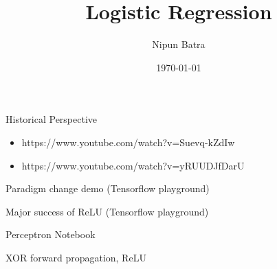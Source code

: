 \documentclass{beamer}
\title{Logistic Regression}
\date{\today}
\author{Nipun Batra}
\institute{IIT Gandhinagar}
\begin{document}
	\maketitle
	
	\begin{frame}{Historical Perspective}
	\begin{itemize}
		\item https://www.youtube.com/watch?v=Suevq-kZdIw
		\item https://www.youtube.com/watch?v=yRUUDJfDarU
	\end{itemize}
\end{frame}

\begin{frame}{Paradigm change demo (Tensorflow playground)}
\end{frame}

\begin{frame}{Major success of ReLU (Tensorflow playground)}
\end{frame}

\begin{frame}{Perceptron Notebook}
\end{frame}

\begin{frame}{XOR forward propagation, ReLU}
\end{frame}
\end{document}
